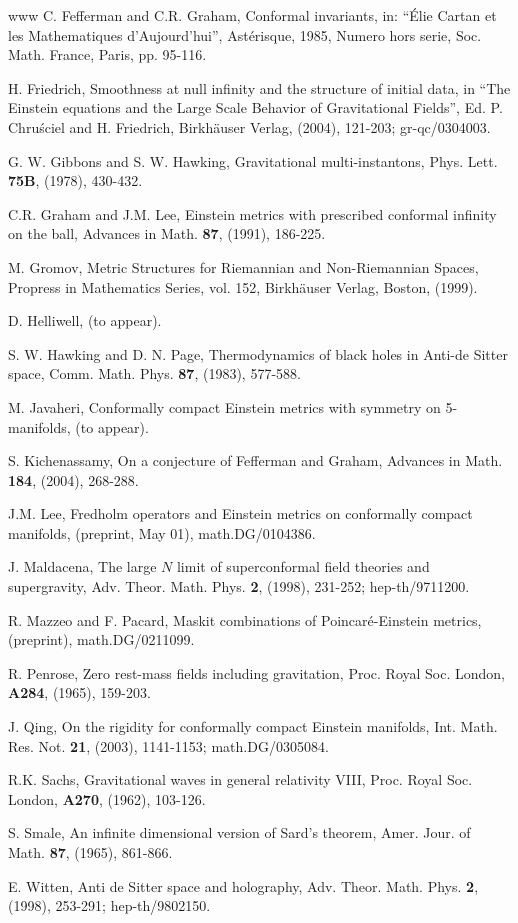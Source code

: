 \documentclass[11pt,amsfonts]{amsart}
\begin{document}
\begin{thebibliography}{www}
 C. Fefferman and C.R. Graham, Conformal invariants, in: ``\'Elie Cartan 
et les Mathematiques d'Aujourd'hui'', Ast\'erisque, 1985, Numero hors serie, Soc. 
Math. France, Paris, pp. 95-116.

 H. Friedrich, Smoothness at null infinity and 
the structure of initial data, in ``The Einstein equations and the Large 
Scale Behavior of Gravitational Fields'', Ed. P. Chru\'sciel and H. 
Friedrich, Birkh\"auser Verlag, (2004), 121-203; gr-qc/0304003.  

 G. W. Gibbons and S. W. Hawking, Gravitational multi-instantons, 
Phys. Lett. {\bf 75B}, (1978), 430-432. 

 C.R. Graham and J.M. Lee, Einstein metrics with prescribed 
conformal infinity on the ball, Advances in Math. {\bf 87}, (1991), 186-225.

 M. Gromov, Metric Structures for Riemannian and Non-Riemannian 
Spaces, Propress in Mathematics Series, vol. 152, Birkh\"auser Verlag, Boston, 
(1999). 

 D. Helliwell, (to appear). 

 S. W. Hawking and D. N. Page, Thermodynamics of black holes in Anti-de Sitter 
space, Comm. Math. Phys. {\bf 87}, (1983), 577-588.

 M. Javaheri, Conformally compact Einstein metrics with symmetry 
on 5-manifolds, (to appear). 

 S. Kichenassamy, On a conjecture of Fefferman and Graham, 
Advances in Math. {\bf 184}, (2004), 268-288.

 J.M. Lee, Fredholm operators and Einstein metrics on conformally 
compact manifolds, (preprint, May 01), math.DG/0104386.

 J. Maldacena, The large $N$ limit of superconformal field 
theories and supergravity, Adv. Theor. Math. Phys. {\bf 2}, (1998), 231-252; 
hep-th/9711200.

 R. Mazzeo and F. Pacard, Maskit combinations of Poincar\'e-Einstein 
metrics, (preprint), math.DG/0211099.

 R. Penrose, Zero rest-mass fields including gravitation, 
Proc. Royal Soc. London, {\bf A284}, (1965), 159-203. 

 J. Qing, On the rigidity for conformally compact Einstein manifolds, 
Int. Math. Res. Not. {\bf 21}, (2003), 1141-1153; math.DG/0305084. 

 R.K. Sachs, Gravitational waves in general relativity VIII, 
Proc. Royal Soc. London, {\bf A270}, (1962), 103-126.  

 S. Smale, An infinite dimensional version of Sard's theorem, 
Amer. Jour. of Math. {\bf 87}, (1965), 861-866. 

 E. Witten, Anti de Sitter space and holography, Adv. Theor. Math. 
Phys. {\bf 2}, (1998), 253-291; hep-th/9802150.

\end{thebibliography}
\end{document}

